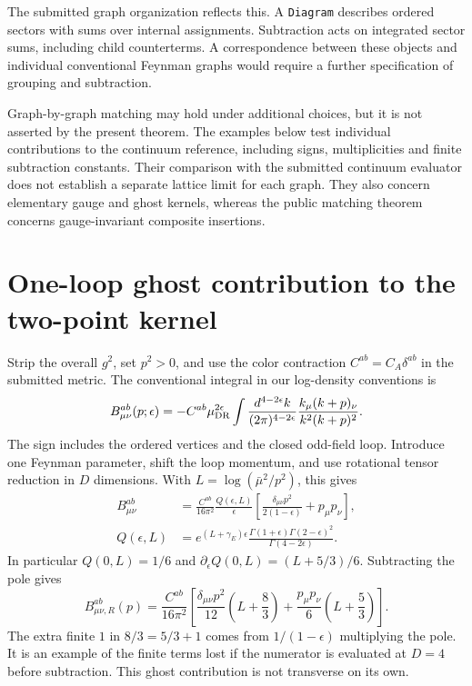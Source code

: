 \documentclass[11pt]{article}
\newcommand{\code}[1]{{\small\nolinkurl{#1}}}
\begin{document}
The submitted graph organization reflects this. A \code{Diagram} describes
ordered sectors with sums over internal assignments. Subtraction acts on
integrated sector sums, including child counterterms. A correspondence
between these objects and individual conventional Feynman graphs would
require a further specification of grouping and subtraction.

Graph-by-graph matching may hold under additional choices, but it is not
asserted by the present theorem. The examples below test individual
contributions to the continuum reference, including signs, multiplicities
and finite subtraction constants. Their comparison with the submitted
continuum evaluator does not establish a separate lattice limit for each
graph. They also concern elementary gauge and ghost kernels, whereas the
public matching theorem concerns gauge-invariant composite insertions.

\section{One-loop ghost contribution to the two-point kernel}
\label{sec:bubble}

Strip the overall $g^2$, set $p^2>0$, and use the color contraction
$C^{ab}=C_A\delta^{ab}$ in the submitted metric. The conventional integral
in our log-density conventions is
\begin{equation}\label{eq:bubble-integral}
 B^{ab}_{\mu\nu}(p;\epsilon)
 =-C^{ab}\mu_{\rm DR}^{2\epsilon}
 \int\frac{d^{4-2\epsilon}k}{(2\pi)^{4-2\epsilon}}
 \frac{k_\mu(k+p)_\nu}{k^2(k+p)^2}.
\end{equation}
The sign includes the ordered vertices and the closed odd-field loop.
Introduce one Feynman parameter, shift the loop momentum, and use rotational
tensor reduction in $D$ dimensions. With $L=\log(\bar\mu^2/p^2)$, this gives
\begin{align}
 B^{ab}_{\mu\nu}
 &=\frac{C^{ab}}{16\pi^2}\frac{Q(\epsilon,L)}{\epsilon}
 \left[\frac{\delta_{\mu\nu}p^2}{2(1-\epsilon)}+p_\mu p_\nu\right],
 \label{eq:bubble-gamma}\\
 Q(\epsilon,L)
 &=e^{(L+\gamma_E)\epsilon}
 \frac{\Gamma(1+\epsilon)\Gamma(2-\epsilon)^2}{\Gamma(4-2\epsilon)}.
\end{align}
In particular $Q(0,L)=1/6$ and
$\partial_\epsilon Q(0,L)=(L+5/3)/6$. Subtracting the pole gives
\begin{equation}\label{eq:bubble-answer}
 \boxed{B^{ab}_{\mu\nu,R}(p)=\frac{C^{ab}}{16\pi^2}
 \left[\frac{\delta_{\mu\nu}p^2}{12}\left(L+\frac83\right)
 +\frac{p_\mu p_\nu}{6}\left(L+\frac53\right)\right].}
\end{equation}
The extra finite $1$ in $8/3=5/3+1$ comes from $1/(1-\epsilon)$ multiplying
the pole. It is an example of the finite terms lost if the numerator is
evaluated at $D=4$ before subtraction. This ghost contribution is not
transverse on its own.
\end{document}
